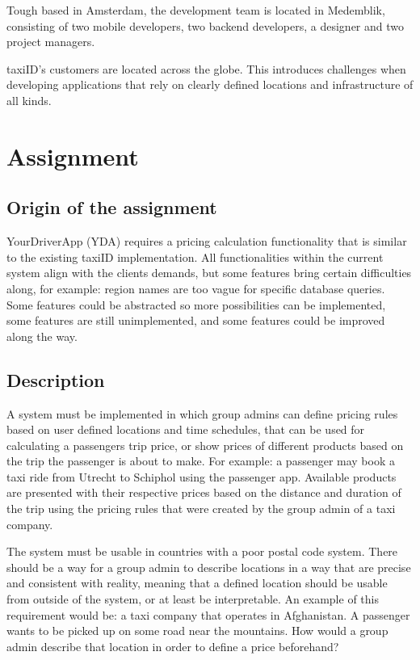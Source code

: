 \documentclass[11pt,conference]{IEEEtran}
\begin{document}
Tough based in Amsterdam, the development team is located in Medemblik, consisting of two mobile developers, two backend developers, a designer and two project managers.

taxiID's customers are located across the globe. This introduces challenges when developing applications that rely on clearly defined locations and infrastructure of all kinds.

%
\section{Assignment}


\subsection{Origin of the assignment}
YourDriverApp (YDA) requires a pricing calculation functionality that is similar to the existing taxiID implementation. All functionalities within the current system align with the clients demands, but some features bring certain difficulties along, for example: region names are too vague for specific database queries. Some features could be abstracted so more possibilities can be implemented, some features are still unimplemented, and some features could be improved along the way.

\subsection{Description}
A system must be implemented in which group admins can define pricing rules based on user defined locations and time schedules, that can be used for calculating a passengers trip price, or show prices of different products based on the trip the passenger is about to make. For example: a passenger may book a taxi ride from Utrecht to Schiphol using the passenger app. Available products are presented with their respective prices based on the distance and duration of the trip using the pricing rules that were created by the group admin of a taxi company.

The system must be usable in countries with a poor postal code system. There should be a way for a group admin to describe locations in a way that are precise and consistent with reality, meaning that a defined location should be usable from outside of the system, or at least be interpretable. An example of this requirement would be: a taxi company that operates in Afghanistan. A passenger wants to be picked up on some road near the mountains. How would a group admin describe that location in order to define a price beforehand?
\end{document}
